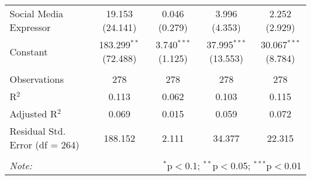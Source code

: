 \begin{table}[H]
{\begin{tabular}{@{\extracolsep{5pt}}lcccc}
  Social Media Expressor & 19.153 (24.141) & 0.046 (0.279) & 3.996 (4.353) & 2.252 (2.929) \\ 
  Constant & 183.299$^{**}$ (72.488) & 3.740$^{***}$ (1.125) & 37.995$^{***}$ (13.553) & 30.067$^{***}$ (8.784) \\ 
 \hline \\[-1.8ex] 
Observations & 278 & 278 & 278 & 278 \\ 
R$^{2}$ & 0.113 & 0.062 & 0.103 & 0.115 \\ 
Adjusted R$^{2}$ & 0.069 & 0.015 & 0.059 & 0.072 \\ 
Residual Std. Error (df = 264) & 188.152 & 2.111 & 34.377 & 22.315 \\ 
\hline 
\hline \\[-1.8ex] 
\textit{Note:}  & \multicolumn{4}{r}{$^{*}$p$<$0.1; $^{**}$p$<$0.05; $^{***}$p$<$0.01} \\ 
\end{tabular} 
}
\end{table} 
